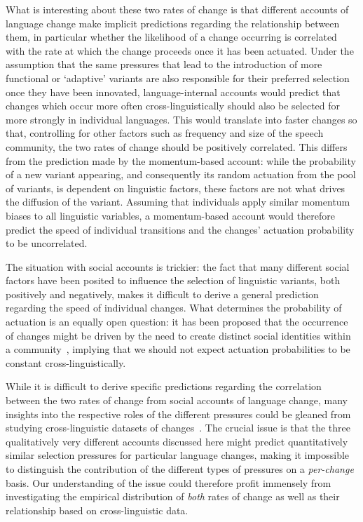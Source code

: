 \documentclass[10pt]{article}
\begin{document}
What is interesting about these two rates of change is that different accounts of language change make implicit predictions regarding the relationship between them, in particular whether the likelihood of a change occurring is correlated with the rate at which the change proceeds once it has been actuated. Under the assumption that the same pressures that lead to the introduction of more functional or `adaptive' variants are also responsible for their preferred selection once they have been innovated, language-internal accounts would predict that changes which occur more often cross-linguistically should also be selected for more strongly in individual languages. This would translate into faster changes so that, controlling for other factors such as frequency and size of the speech community, the two rates of change should be positively correlated. 
This differs from the prediction made by the momentum-based account: while the probability of a new variant appearing, and consequently its random actuation from the pool of variants, is dependent on linguistic factors, these factors are not what drives the diffusion of the variant. Assuming that individuals apply similar momentum biases to all linguistic variables, a momentum-based account would therefore predict the speed of individual transitions and the changes' actuation probability to be uncorrelated.

The situation with social accounts is trickier: the fact that many different social factors have been posited to influence the selection of linguistic variants, both positively and negatively, makes it difficult to derive a general prediction regarding the speed of individual changes. What determines the probability of actuation is an equally open question: it has been proposed that the occurrence of changes might be driven by the need to create distinct social identities within a community~\citep{Labov2002,Matthews2012,Roberts2013}, implying that we should not expect actuation probabilities to be constant cross-linguistically. 

While it is difficult to derive specific predictions regarding the correlation between the two rates of change from social accounts of language change, many insights into the respective roles of the different pressures could be gleaned from studying cross-linguistic datasets of changes~\citep[see also][]{Bickel2015}. The crucial issue is that the three qualitatively very different accounts discussed here might predict quantitatively similar selection pressures for particular language changes, making it impossible to distinguish the contribution of the different types of pressures on a \emph{per-change} basis. Our understanding of the issue could therefore profit immensely from investigating the empirical distribution of \emph{both} rates of change as well as their relationship based on cross-linguistic data.
\end{document}
